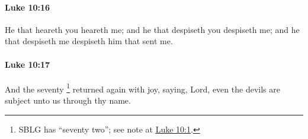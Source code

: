 		\paragraph{Luke 10:16} %
			\label{LUKE-10-16}

			He that heareth you heareth me; and he that despiseth you despiseth me; and he that despiseth me despiseth him that sent me.

			\begin{framed}
			\scriptsize
				\begin{compactdesc}
					\item[SBLG] 
				\end{compactdesc}
			\end{framed}

		\paragraph{Luke 10:17} %
			\label{LUKE-10-17}

			And the seventy%
				\footnote{%
					SBLG has ``seventy two''; see note at \hyperref[LUKE-10-1]{Luke 10:1}.
					}
			returned again with joy, saying, Lord, even the devils are subject unto us through thy name.

